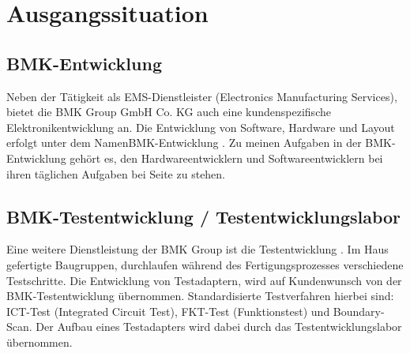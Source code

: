 



\section{Ausgangssituation}


\subsection{BMK-Entwicklung}
Neben der Tätigkeit als EMS-Dienstleister (Electronics Manufacturing Services), bietet die \glqq BMK Group GmbH  Co. KG \grqq{} auch eine kundenspezifische Elektronikentwicklung an. Die Entwicklung von Software, Hardware und Layout erfolgt unter dem Namen\glqq BMK-Entwicklung \grqq{} . 
Zu meinen Aufgaben in der BMK-Entwicklung gehört es, den Hardwareentwicklern und Softwareentwicklern bei ihren täglichen Aufgaben bei Seite zu stehen. 


\subsection{BMK-Testentwicklung / Testentwicklungslabor}
Eine weitere Dienstleistung der \glqq BMK Group \grqq{} ist die \glqq Testentwicklung \grqq{}. Im Haus gefertigte Baugruppen, durchlaufen während des Fertigungsprozesses verschiedene Testschritte. Die Entwicklung von Testadaptern, wird auf Kundenwunsch von der BMK-Testentwicklung übernommen. Standardisierte Testverfahren hierbei sind: ICT-Test (Integrated Circuit Test), FKT-Test (Funktionstest) und Boundary-Scan. Der Aufbau eines Testadapters wird dabei durch das Testentwicklungslabor übernommen. 

